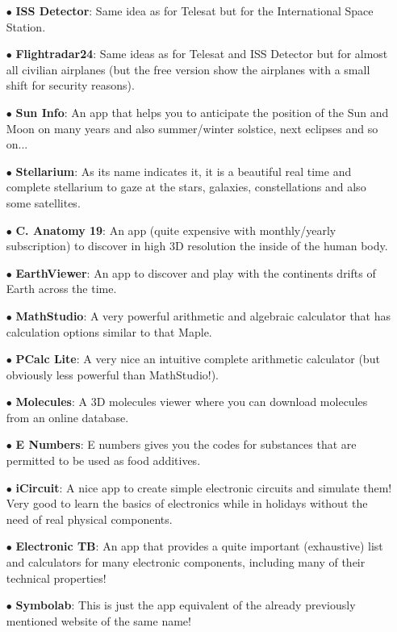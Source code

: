 \begin{itemize}
		\item[$\bullet$] \textbf{ISS Detector}: Same idea as for Telesat but for the International Space Station.
		
		\item[$\bullet$] \textbf{Flightradar24}: Same ideas as for Telesat and ISS Detector but for almost all civilian airplanes (but the free version show the airplanes with a small shift for security reasons).
		
		\item[$\bullet$]  \textbf{Sun Info}: An app that helps you to anticipate the position of the Sun and Moon on many years and also summer/winter solstice, next eclipses and so on...
		
		\item[$\bullet$] \textbf{Stellarium}: As its name indicates it, it is a beautiful real time and complete stellarium to gaze at the stars, galaxies, constellations and also some satellites.
		
		 \item[$\bullet$] \textbf{C. Anatomy 19}: An app (quite expensive with monthly/yearly subscription) to discover in high 3D resolution the inside of the human body.
		 
		 \item[$\bullet$] \textbf{EarthViewer}: An app to discover and play with the continents drifts of Earth across the time.
		 
		 \item[$\bullet$] \textbf{MathStudio}: A very powerful arithmetic and algebraic calculator that has calculation options similar to that Maple.
		 
		 \item[$\bullet$] \textbf{PCalc Lite}: A very nice an intuitive complete arithmetic calculator (but obviously less powerful than MathStudio!).
		 
		 \item[$\bullet$] \textbf{Molecules}: A 3D molecules viewer where you can download molecules from an online database.
		 
		 \item[$\bullet$] \textbf{E Numbers}: E numbers gives you the codes for substances that are permitted to be used as food additives.
		 
		 \item[$\bullet$] \textbf{iCircuit}: A nice app to create simple electronic circuits and simulate them! Very good to learn the basics of electronics while in holidays without the need of real physical components.
		 
		 \item[$\bullet$] \textbf{Electronic TB}: An app that provides a quite important (exhaustive) list and calculators for many electronic components, including many of their technical properties!
		 
		 \item[$\bullet$] \textbf{Symbolab}: This is just the app equivalent of the already previously mentioned website of the same name! 
	\end{itemize}